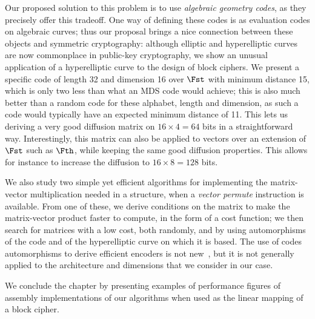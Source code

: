 Our proposed solution to this problem is to use \emph{algebraic geometry codes}, as they precisely offer this tradeoff.
One way of defining these codes is as evaluation codes on algebraic curves; thus our proposal brings a nice connection between these objects and
symmetric cryptography: although elliptic and hyperelliptic curves are now commonplace in public-key cryptography, we show an unusual application of
a hyperelliptic curve to the design of block ciphers. We present a specific code of length 32 and dimension 16 over $\Fst$ with minimum distance 15, which is only
two less than what an MDS code would achieve; this is also much better than a random code for these alphabet, length and dimension, as such a code
would typically have an expected minimum distance of 11.
This lets us deriving a very good diffusion matrix on $16\times4 = 64$ bits in a straightforward way. Interestingly, this matrix can also be applied
to vectors over an extension of $\Fst$ such as $\Fth$, while keeping the same good diffusion properties.
This allows for instance to increase the diffusion to $16\times8 = 128$ bits.

We also study two simple yet efficient algorithms for implementing the matrix-vector multiplication needed in a \shark{}
structure, when a \emph{vector permute} instruction is available. From one of these, we derive conditions on the matrix to make the matrix-vector product
faster to compute, in the form of a cost function; we then search for matrices with a low cost, both randomly, and by using automorphisms of the code and of the hyperelliptic
curve on which it is based. The use of codes automorphisms to derive efficient encoders is not new~\cite{sysgrob,grobarch},
but it is not generally applied to the architecture and dimensions that we consider in our case.

We conclude the chapter by presenting examples of performance figures of assembly implementations of our algorithms when used as the linear mapping of
a block cipher.
